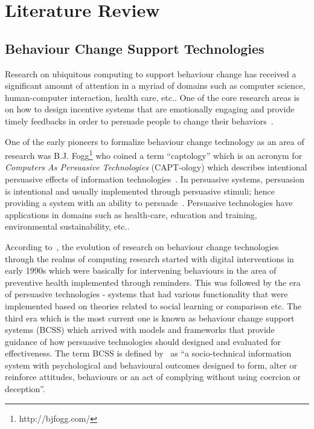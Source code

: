 
\chapter{Literature Review} %

\label{literaturereview} %


\section{Behaviour Change Support Technologies}
Research on ubiquitous computing to support behaviour change  has received a significant amount of attention in a myriad of domains such as computer science, human-computer interaction, health care, etc.. One of the core research areas is on how to design incentive systems that are emotionally engaging and  provide timely feedbacks in order to persuade people to change their behaviors~\citep{nakajima2013designing}. 

One of the early pioneers to formalize behaviour change technology as an area of research was B.J. Fogg\footnote{http://bjfogg.com/} who coined a term “captology” which is an acronym for \emph{Computers As Persuasive Technologies} (CAPT-ology) which describes intentional persuasive effects of information technologies~\citep{fogg1999persuasive}. In persuasive systems, persuasion is intentional and usually implemented through persuasive stimuli; hence providing a system with an ability to persuade~\citep{hamari2014persuasive}. Persuasive technologies have applications in domains such as health-care, education and training, environmental sustainability, etc..

According to~\cite{langrial2012digital}, the evolution of research on behaviour change technologies through the realms of computing research started with digital interventions in early 1990s which were basically for intervening behaviours in the area of preventive health implemented through reminders. This was followed by the era of persuasive technologies - systems that had various functionality that were implemented based on theories related to social learning or comparison etc. The third era which is the most current one is known as behaviour change support systems (BCSS) which arrived with models and frameworks that provide guidance of how persuasive technologies should designed and evaluated for effectiveness. The term BCSS is defined by~\cite{Oinas-Kukkonen:foundation} as ``a socio-technical information system with psychological and behavioural outcomes designed to form, alter or reinforce attitudes, behaviours or an act of complying without using coercion or deception''.

